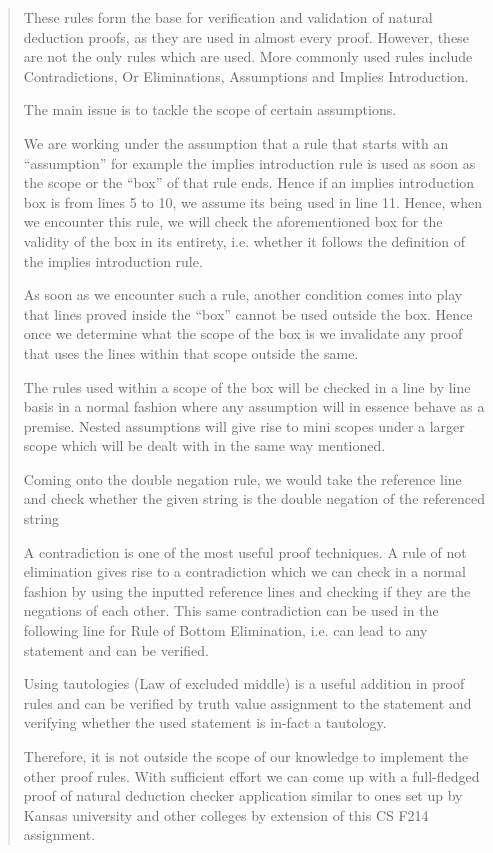 \begin{quote}
\begin{DoxyItemize}
\item These rules form the base for verification and validation of natural deduction proofs, as they are used in almost every proof. However, these are not the only rules which are used. More commonly used rules include Contradictions, Or Eliminations, Assumptions and Implies Introduction.
\item The main issue is to tackle the scope of certain assumptions.
\item We are working under the assumption that a rule that starts with an “assumption” for example the implies introduction rule is used as soon as the scope or the “box” of that rule ends. Hence if an implies introduction box is from lines 5 to 10, we assume its being used in line 11. Hence, when we encounter this rule, we will check the aforementioned box for the validity of the box in its entirety, i.\+e. whether it follows the definition of the implies introduction rule.
\item As soon as we encounter such a rule, another condition comes into play that lines proved inside the “box” cannot be used outside the box. Hence once we determine what the scope of the box is we invalidate any proof that uses the lines within that scope outside the same.
\item The rules used within a scope of the box will be checked in a line by line basis in a normal fashion where any assumption will in essence behave as a premise. Nested assumptions will give rise to mini scopes under a larger scope which will be dealt with in the same way mentioned.
\item Coming onto the double negation rule, we would take the reference line and check whether the given string is the double negation of the referenced string
\item A contradiction is one of the most useful proof techniques. A rule of not elimination gives rise to a contradiction which we can check in a normal fashion by using the inputted reference lines and checking if they are the negations of each other. This same contradiction can be used in the following line for Rule of Bottom Elimination, i.\+e. can lead to any statement and can be verified.
\item Using tautologies (Law of excluded middle) is a useful addition in proof rules and can be verified by truth value assignment to the statement and verifying whether the used statement is in-\/fact a tautology.
\item Therefore, it is not outside the scope of our knowledge to implement the other proof rules. With sufficient effort we can come up with a full-\/fledged proof of natural deduction checker application similar to ones set up by Kansas university and other colleges by extension of this CS F214 assignment. ~\newline
~\newline
~\newline
 
\end{DoxyItemize}\end{quote}
